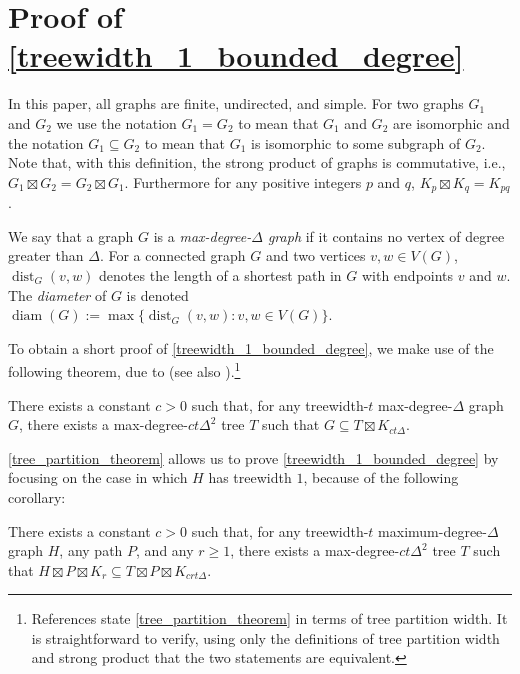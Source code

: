 \documentclass{patmorin}
\newcommand{\defin}[1]{\emph{\color{brightmaroon}#1}}
\DeclareMathOperator{\dist}{dist}
\DeclareMathOperator{\diam}{diam}
\begin{document}
\section{Proof of \cref{treewidth_1_bounded_degree}}

In this paper, all graphs are finite, undirected, and simple.  For two graphs $G_1$ and $G_2$ we use the notation $G_1=G_2$ to mean that $G_1$ and $G_2$ are isomorphic and the notation $G_1\subseteq G_2$ to mean that $G_1$ is isomorphic to some subgraph of $G_2$.  Note that, with this definition, the strong product of graphs is commutative, i.e., $G_1\boxtimes G_2=G_2\boxtimes G_1$.  Furthermore for any positive integers $p$ and $q$, $K_{p}\boxtimes K_{q}=K_{pq}$.

We say that a graph $G$ is a \defin{max-degree-$\Delta$ graph} if it contains no vertex of degree greater than $\Delta$.  For a connected graph $G$ and two vertices $v,w\in V(G)$, $\dist_G(v,w)$ denotes the length of a shortest path in $G$ with endpoints $v$ and $w$.  The \defin{diameter} of $G$ is denoted $\diam(G):=\max\{\dist_G(v,w):v,w\in V(G)\}$.

To obtain a short proof of \cref{treewidth_1_bounded_degree}, we make use of the following theorem, due to \citet{ding.oporowski:some} (see also \citet{wood:on}).\footnote{References \cite{ding.oporowski:some,wood:on} state \cref{tree_partition_theorem} in terms of tree partition width. It is straightforward to verify, using only the definitions of tree partition width and strong product that the two statements are equivalent.}

\begin{thm}\label{tree_partition_theorem}
  There exists a constant $c>0$ such that, for any treewidth-$t$ max-degree-$\Delta$ graph $G$, there exists a max-degree-$ct\Delta^2$ tree $T$ such that $G\subseteq T\boxtimes K_{ct\Delta}$.
\end{thm}

\cref{tree_partition_theorem} allows us to prove \cref{treewidth_1_bounded_degree} by focusing on the case in which $H$ has treewidth $1$, because of the following corollary:

\begin{cor}\label{tree_partition_corollary}
  There exists a constant $c>0$ such that, for any treewidth-$t$ maximum-degree-$\Delta$ graph $H$, any path $P$, and any $r\ge 1$, there exists a max-degree-$ct\Delta^2$ tree $T$ such that $H\boxtimes P\boxtimes K_r \subseteq T\boxtimes P\boxtimes K_{crt\Delta}$.
\end{cor}
\end{document}
